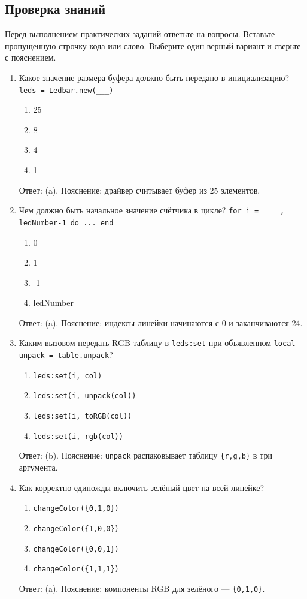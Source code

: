 \subsection{Проверка знаний}
Перед выполнением практических заданий ответьте на вопросы. Вставьте пропущенную строчку кода или слово. Выберите один верный вариант и сверьте с пояснением.
\begin{enumerate}
\item Какое значение размера буфера должно быть передано в инициализацию? \verb|leds = Ledbar.new(___)|
  \begin{enumerate}[label=(\alph*)]
    \item 25 \item 8 \item 4 \item 1
  \end{enumerate}
  Ответ: (a). Пояснение: драйвер считывает буфер из 25 элементов.

  \item Чем должно быть начальное значение счётчика в цикле? \verb|for i = ____, ledNumber-1 do ... end|
  \begin{enumerate}[label=(\alph*)]
    \item 0 \item 1 \item -1 \item ledNumber
  \end{enumerate}
  Ответ: (a). Пояснение: индексы линейки начинаются с 0 и заканчиваются 24.

  \item Каким вызовом передать RGB-таблицу в \verb|leds:set| при объявленном \verb|local unpack = table.unpack|?
  \begin{enumerate}[label=(\alph*)]
    \item \verb|leds:set(i, col)| \item \verb|leds:set(i, unpack(col))| \item \verb|leds:set(i, toRGB(col))| \item \verb|leds:set(i, rgb(col))|
  \end{enumerate}
  Ответ: (b). Пояснение: \verb|unpack| распаковывает таблицу \verb|{r,g,b}| в три аргумента.

  \item Как корректно единожды включить зелёный цвет на всей линейке?
  \begin{enumerate}[label=(\alph*)]
    \item \verb|changeColor({0,1,0})| \item \verb|changeColor({1,0,0})| \item \verb|changeColor({0,0,1})| \item \verb|changeColor({1,1,1})|
  \end{enumerate}
  Ответ: (a). Пояснение: компоненты RGB для зелёного — \verb|{0,1,0}|.


\end{enumerate}
